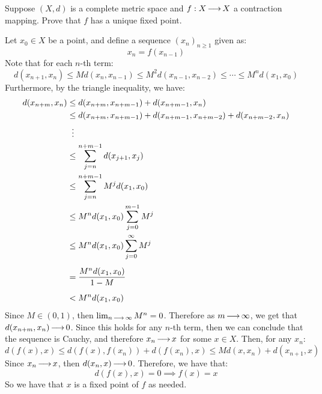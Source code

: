 \newpage
\label{q11}
\begin{qu}[title=Banach Fixed Point Theorem,num=11.1]
    Suppose $ (X, d) $ is a complete metric space and $ f : X \operatorname{\longrightarrow} X $ a
    contraction mapping. Prove that $ f $ has a unique fixed point.
\end{qu}

\begin{soln}
    Let $ x_{0} \in X $ be a point, and define a sequence $ (x_{n})_{n \geq 1} $
    given as:
    \begin{equation*}
        x_{n} = f(x_{n-1})
    \end{equation*}
    Note that for each $ n $-th term:
    \begin{equation*}
        d(x_{n+1}, x_{n}) \leq Md(x_{n}, x_{n-1}) \leq M^{2}d(x_{n-1}, x_{n-2})
        \leq \cdots \leq M^{n}d(x_{1}, x_{0})
    \end{equation*}
    Furthermore, by the triangle inequality, we have:
    \begin{align*}
        d(x_{n+m}, x_{n}) & \leq d(x_{n+m}, x_{n+m-1}) + d(x_{n+m-1}, x_{n}) \\
                          & \leq d(x_{n+m}, x_{n+m-1}) + d(x_{n+m-1}, x_{n+m-2})
                          + d(x_{n+m-2}, x_{n}) \\
                          & \ \: \vdots \\
                          & \leq \sum_{j=n}^{n+m-1} d(x_{j+1}, x_{j}) \\
                          & \leq \sum_{j=n}^{n+m-1} M^{j} d(x_{1}, x_{0}) \\
                          & \leq M^{n}d(x_{1}, x_{0})\sum_{j=0}^{m-1} M^{j} \\
                          & \leq M^{n}d(x_{1}, x_{0})\sum_{j=0}^{\infty}M^{j}
                          \vsp
                          & = \frac{M^{n}d(x_{1}, x_{0})}{1 - M} \vsp
                          & < M^{n}d(x_{1}, x_{0})
    \end{align*}
    Since $ M \in (0, 1) $, then $ \lim_{n \operatorname{\longrightarrow} \infty} M^{n} = 0 $.
    Therefore as $ m \operatorname{\longrightarrow} \infty $, we get that $ d(x_{n+m}, x_{n})
    \operatorname{\longrightarrow} 0 $. Since this holds for any $ n $-th term, then we can conclude
    that the sequence is Cauchy, and therefore $ x_{n} \operatorname{\longrightarrow} x $ for some
    $ x \in X $. Then, for any $ x_{n} $:
    \begin{equation*}
        d(f(x), x) \leq d(f(x), f(x_{n})) + d(f(x_{n}), x) \leq Md(x, x_{n})
        + d(x_{n+1}, x)
    \end{equation*}
    Since $ x_{n} \operatorname{\longrightarrow} x $, then $ d(x_{n}, x) \operatorname{\longrightarrow} 0 $.
    Therefore, we have that:
    \begin{equation*}
        d(f(x), x) = 0 \implies f(x) = x
    \end{equation*}
    So we have that $ x $ is a fixed point of $ f $ as needed.
\end{soln}

